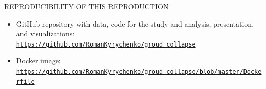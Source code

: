 \documentclass[11pt, aspectratio=169]{beamer}
\begin{document}
\begin{frame}{\MakeUppercase{Reproducibility of This Reproduction}}

    \begin{itemize}
        \itemsep1em
        \item GitHub repository with data, code for the study and analysis, presentation, and visualizations: \\ \href{https://github.com/RomanKyrychenko/groud_collapse}{\texttt{https://github.com/RomanKyrychenko/groud\_collapse}}
        \item Docker image: \\ \href{https://github.com/RomanKyrychenko/groud_collapse/blob/master/Dockerfile}{\texttt{https://github.com/RomanKyrychenko/groud\_collapse/blob/master/Dockerfile}}
    \end{itemize}

\end{frame}
\end{document}
